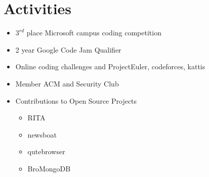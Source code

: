\documentclass[11pt]{article}
\begin{document}
\section{A{\color{gray}ctivities}}

\begin{multicols}{2}
\begin{itemize}
	\item $3^{rd}$ place Microsoft campus coding competition
	\item 2 year Google Code Jam Qualifier
	\item Online coding challenges and ProjectEuler, codeforces, kattis
	\item Member ACM and Security Club
	\item Contributions to Open Source Projects
\begin{multicols}{2}
	\begin{itemize} 
		\item RITA 
		\item newsboat 
		\item qutebrowser 
		\item BroMongoDB 
	\end{itemize}
\end{multicols}
\end{itemize}
\end{multicols}
\end{document}
